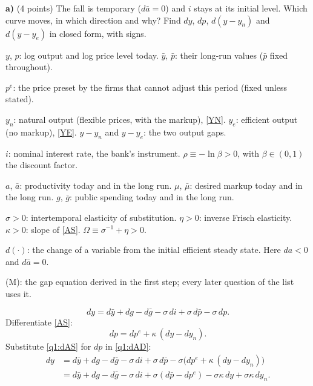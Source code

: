 \textbf{a)} (4 points) The fall is temporary ($d\bar a=0$) and $i$ stays at its initial level. Which curve moves, in which direction and
why? Find $dy$, $dp$, $d(y-y_n)$ and $d(y-y_e)$ in closed form, with signs.
\resolespaco
\begin{sol}
\begin{notacao}
\item $y$, $p$: log output and log price level today. $\bar y$, $\bar p$: their long-run values ($\bar p$ fixed throughout).
\item $p^e$: the price preset by the firms that cannot adjust this period (fixed unless stated).
\item $y_n$: natural output (flexible prices, with the markup), \eqref{YN}. $y_e$: efficient output (no markup), \eqref{YE}.
$y-y_n$ and $y-y_e$: the two output gaps.
\item $i$: nominal interest rate, the bank's instrument. $\rho\equiv-\ln\beta>0$, with $\beta\in(0,1)$ the discount factor.
\item $a$, $\bar a$: productivity today and in the long run. $\mu$, $\bar\mu$: desired markup today and in the long run.
$g$, $\bar g$: public spending today and in the long run.
\item $\sigma>0$: intertemporal elasticity of substitution. $\eta>0$: inverse Frisch elasticity. $\kappa>0$: slope of \eqref{AS}.
$\Omega\equiv\sigma^{-1}+\eta>0$.
\item $d(\cdot)$: the change of a variable from the initial efficient steady state. Here $da<0$ and $d\bar a=0$.
\item (M): the gap equation derived in the first step; every later question of the list uses it.
\end{notacao}
\begin{equation}
dy=d\bar y+dg-d\bar g-\sigma\,di+\sigma\,d\bar p-\sigma\,dp. \label{q1:dAD}
\end{equation}
Differentiate \eqref{AS}:
\begin{equation}
dp=dp^e+\kappa\,(dy-dy_n). \label{q1:dAS}
\end{equation}
Substitute \eqref{q1:dAS} for $dp$ in \eqref{q1:dAD}:
\begin{align}
dy&=d\bar y+dg-d\bar g-\sigma\,di+\sigma\,d\bar p-\sigma\big(dp^e+\kappa\,(dy-dy_n)\big)\nonumber\\
&=d\bar y+dg-d\bar g-\sigma\,di+\sigma(d\bar p-dp^e)-\sigma\kappa\,dy+\sigma\kappa\,dy_n . \nonumber
\end{align}

\end{sol}
